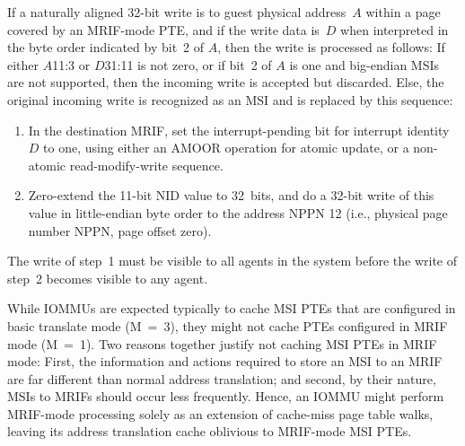 If a naturally aligned 32-bit write is to guest physical address~$A$
within a page covered by an MRIF-mode PTE, and if the write
data is~$D$ when interpreted in the byte order indicated
by bit~2 of $A$, then the write is processed as follows:
If either $A$\z{[}11:3\z{]} or $D$\z{[}31:11\z{]} is not zero, or if
bit~2 of $A$ is one and big-endian MSIs are not supported, then the
incoming write is accepted but discarded.
Else, the original incoming write is recognized
as an MSI and is replaced by this sequence:
\begin{enumerate}

\item
In the destination MRIF, set the interrupt-pending bit for interrupt
identity $D$ to one, using either an AMOOR operation for atomic update,
or a non-atomic read-modify-write sequence.

\item
Zero-extend the \mbox{11-bit} NID value to 32~bits, and do a
\mbox{32-bit} write of this value in little-endian byte order to the
address NPPN\,\z{<<}\,12 (i.e., physical page number NPPN, page offset
zero).

\end{enumerate}
The write of step~1 must be visible to all agents in the system before
the write of step~2 becomes visible to any agent.

\begin{commentary}
While \mbox{IOMMU}s are expected typically to cache MSI PTEs that are
configured in basic translate mode (M~=~3), they might not cache PTEs
configured in MRIF mode (M~=~1).
Two reasons together justify not caching MSI PTEs in MRIF mode:
First, the information and actions required to store an MSI to an MRIF
are far different than normal address translation; and
second, by their nature, MSIs to MRIFs should occur less frequently.
Hence, an \mbox{IOMMU} might perform MRIF-mode processing solely as
an extension of cache-miss page table walks, leaving its address
translation cache oblivious to MRIF-mode MSI PTEs.
\end{commentary}

